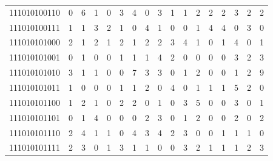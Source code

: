 \documentclass[10pt,a4paper]{article}
\begin{document}
\begin{longtable}{ |c|c|c|c|c|c|c|c|c|c|c|c|c|c|c|c|c| }
    111010100110              & 0                            & 6                                & 1                            & 0                              & 3   & 4   & 0   & 3   & 1   & 1   & 2   & 2   & 2   & 3   & 2   & 2   \\
    111010100111              & 1                            & 1                                & 3                            & 2                              & 1   & 0   & 4   & 1   & 0   & 0   & 1   & 4   & 4   & 0   & 3   & 0   \\
    111010101000              & 2                            & 1                                & 2                            & 1                              & 2   & 1   & 2   & 2   & 3   & 4   & 1   & 0   & 1   & 4   & 0   & 1   \\
    111010101001              & 0                            & 1                                & 0                            & 0                              & 1   & 1   & 1   & 4   & 2   & 0   & 0   & 0   & 0   & 3   & 2   & 3   \\
    111010101010              & 3                            & 1                                & 1                            & 0                              & 0   & 7   & 3   & 3   & 0   & 1   & 2   & 0   & 0   & 1   & 2   & 9   \\
    111010101011              & 1                            & 0                                & 0                            & 0                              & 1   & 1   & 2   & 0   & 4   & 0   & 1   & 1   & 1   & 5   & 2   & 0   \\
    111010101100              & 1                            & 2                                & 1                            & 0                              & 2   & 2   & 0   & 1   & 0   & 3   & 5   & 0   & 0   & 3   & 0   & 1   \\
    111010101101              & 0                            & 1                                & 4                            & 0                              & 0   & 0   & 2   & 3   & 0   & 1   & 2   & 0   & 0   & 2   & 0   & 2   \\
    111010101110              & 2                            & 4                                & 1                            & 1                              & 0   & 4   & 3   & 4   & 2   & 3   & 0   & 0   & 1   & 1   & 1   & 0   \\
    111010101111              & 2                            & 3                                & 0                            & 1                              & 3   & 1   & 1   & 0   & 0   & 3   & 2   & 1   & 1   & 1   & 2   & 3   \\

\end{longtable}
\end{document}
